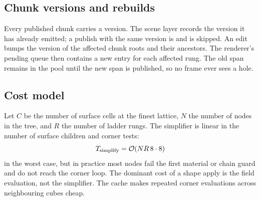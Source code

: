 \subsection{Chunk versions and rebuilds}

Every published chunk carries a version.  The scene layer records the
version it has already emitted; a publish with the same version is
 and is skipped.  An edit bumps the version of the affected
chunk roots and their ancestors.  The renderer's pending queue then
contains a new entry for each affected rung.  The old span remains in the
pool until the new span is published, so no frame ever sees a hole.

\subsection{Cost model}

Let $C$ be the number of surface cells at the finest lattice, $N$ the
number of nodes in the tree, and $R$ the number of ladder rungs.  The
simplifier is linear in the number of surface children and corner tests:
\begin{equation}
  T_{\text{simplify}} = \mathcal{O}(N R \, 8 \cdot 8)
\end{equation}
in the worst case, but in practice most nodes fail the first material or
chain guard and do not reach the corner loop.  The dominant cost of a
shape apply is the field evaluation, not the simplifier.  The cache makes
repeated corner evaluations across neighbouring cubes cheap.
